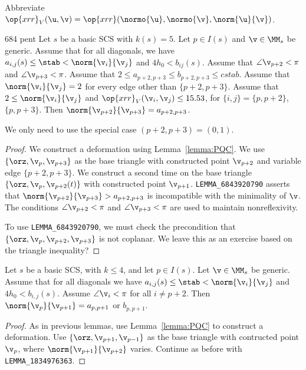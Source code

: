 Abbreviate $\op{xrr}_V (\u,\v) = \op{xrr} (\normo{\u},\normo{\v},\norm{\u}{\v})$.

\begin{lemma}{684 pent}\label{lemma:684-pent}
Let $s$ be a basic SCS with $k(s)=5$.  Let $p\in I(s)$ and $\v\in \MM_s$ be generic.
Assume that for all diagonals, we have $a_{i,j}(s) \le \stab <\norm{\v_i}{\v_j}$ 
and $4h_0 < b_{ij}(s)$.
Assume that $\angle \v_{p+2} < \pi$ and $\angle \v_{p+3} < \pi$.
Assume that $2\le a_{p+2,p+3} \le b_{p+2,p+3} \le cstab$.
Assume that $\norm{\v_i}{\v_j}=2$ for every edge other than $\{p+2,p+3\}$.
Assume that $2\le \norm{\v_i}{\v_j}$ and $\op{xrr}_V(\v_i,\v_j)\le 15.53$, 
for $\{i,j\} = \{p,p+2\}$, $\{p,p+3\}$.
Then $\norm{\v_{p+2}}{\v_{p+3}} = a_{p+2,p+3}$.
\end{lemma}

We only need to use the special case $(p+2,p+3)=(0,1)$.

\begin{proof} We construct a deformation using Lemma~\ref{lemma:PQC}.  We use $\{\orz,\v_p,\v_{p+3}\}$ as
the base triangle with constructed point $\v_{p+2}$ and variable edge $\{p+2,p+3\}$.  We construct a second
time on the base triangle $\{\orz,\v_p,\v_{p+2}(t)\}$ with constructed point $\v_{p+1}$.
{\tt LEMMA\_6843920790} asserts that $\norm{\v_{p+2}}{\v_{p+3}} > a_{p+2,p+3}$ is incompatible with the minimality of $\v$.
The conditions  $\angle \v_{p+2} < \pi$ and $\angle \v_{p+3} < \pi$ 
are used to maintain nonreflexivity.

To use {\tt LEMMA\_6843920790}, we must check the precondition that $\{\orz,\v_p,\v_{p+2},\v_{p+3}\}$
is not coplanar.  We leave this as an exercise based on the triangle inequality?
\end{proof}

\begin{lemma}[1834]\label{lemma:1834}
Let $s$ be a basic SCS, with $k\le 4$, and let $p\in I(s)$.  Let $\v\in \MM_s$ be generic.
Assume that for all diagonals 
we have $a_{i,j}(s)\le\stab <\norm{\v_i}{\v_j}$ and $4h_0<b_{i,j}(s)$.  
Assume $\angle \v_i < \pi$ for all $i\ne p+2$.
Then $\norm{\v_p}{\v_{p+1}} = a_{p,p+1}$ or $b_{p,p+1}$.  
\end{lemma}

\begin{proof} As in previous lemmas, use Lemma~\ref{lemma:PQC} to construct a deformation.
Use $\{\orz,\v_{p+1},\v_{p-1}\}$ as the base triangle with contructed point $\v_{p}$, 
where $\norm{\v_{p+1}}{\v_{p+2}}$ varies.
Continue as before with {\tt LEMMA\_1834976363}.
\end{proof}

